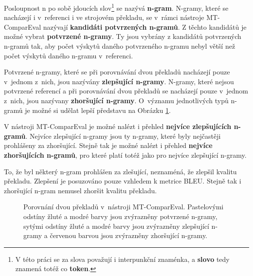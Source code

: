 Posloupnost n po sobě jdoucích slov\footnote{
  V této práci se za slova považují i interpunkční znaménka, a \textbf{slovo} tedy znamená totéž co \textbf{token}.}
  se nazývá \textbf{\mbox{n-gram}}.
N-gramy,
  které se nacházejí i v~referenci i ve strojovém překladu,
  se v~rámci nástroje MT-ComparEval nazývají \textbf{kandidáti potvrzených \mbox{n-gramů}}.
Z těchto kandidátů je možné vybrat \textbf{potvrzené \mbox{n-gramy}}.
Ty jsou vybrány z kandidátů potvrzených \mbox{n-gramů} tak,
  aby počet výskytů daného potvrzeného \mbox{n-gramu} nebyl větší než počet výskytů daného \mbox{n-gramu} v~referenci.

Potvrzené \mbox{n-gramy},
  které se při porovnávání dvou překladů nacházejí pouze v~jednom z~nich,
  jsou nazývány \textbf{zlepšující \mbox{n-gramy}}.
N-gramy,
  které nejsou potvrzené referencí
  a při porovnávání dvou překladů se nacházejí pouze v~jednom z~nich,
  jsou nazývany \textbf{zhoršující \mbox{n-gramy}}.
O~významu jednotlivých typů \mbox{n-gramů} je možné si udělat lepší představu na Obrázku \ref{img:n-grams}.

V nástroji MT-ComparEval je možné nalézt i přehled \textbf{nejvíce zlepšujících \mbox{n-gramů}}.
Nejvíce zlepšující \mbox{n-gramy} jsou ty n-gramy,
  které byly nejčastěji prohlášeny za zhoršující.
Stejně tak je možné nalézt i přehled \textbf{nejvíce zhoršujících \mbox{n-gramů}},
  pro které platí totéž jako pro nejvíce zlepšující n-gramy.

To,
  že byl některý \mbox{n-gram} prohlášen za zlešující,
  neznaméná, že zlepšil kvalitu překladu.
Zlepšení je posuzováno pouze vzhledem k metrice BLEU.
Stejně tak i zhoršující n-gram nemusel zhoršit kvalitu překladu.

\begin{figure}
	\caption{
		Porovnání dvou překladů v~nástroji MT-ComparEval.
		Pastelovými odstíny žluté a modré barvy jsou zvýrazněny potvrzené \mbox{n-gramy},
		sytými odstíny žluté a modré barvy jsou zvýrazněny zlepšující \mbox{n-gramy}
		a červenou barvou jsou zvýrazněny zhoršující \mbox{n-gramy}.
	}
	\label{img:n-grams}
\end{figure}

